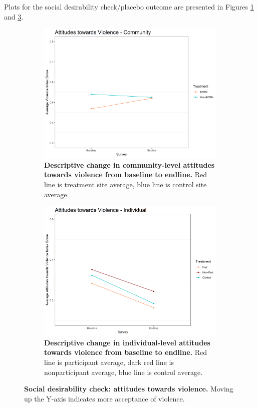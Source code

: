 \documentclass[11pt]{article}
\begin{document}
Plots for the social desirability check/placebo outcome are presented in
Figures \ref{fig:vio_comm} and \ref{fig:vio_ind}.

\begin{figure}[H]
    \begin{subfigure}[b]{.48\textwidth}
    \centering
        \includegraphics[width=\linewidth]{../../../figs/vioComm_plot.png}
        \caption{\textbf{Descriptive change in community-level attitudes towards violence from baseline to endline.} Red line is treatment site average, blue line is control site average.}
        \label{fig:vio_comm}
    \end{subfigure}
    \hfill
    \begin{subfigure}[b]{.48\textwidth}
    \centering
        \includegraphics[width=\linewidth]{../../../figs/vioPan_plot.png}
        \caption{\textbf{Descriptive change in individual-level attitudes towards violence from baseline to endline.} Red line is participant average, dark red line is nonparticipant average, blue line is control average.}
        \label{fig:vio_ind}
    \end{subfigure}
    \caption{\textbf{Social desirability check: attitudes towards violence.}  Moving up the Y-axis indicates more acceptance of violence.}
\end{figure}
\end{document}

